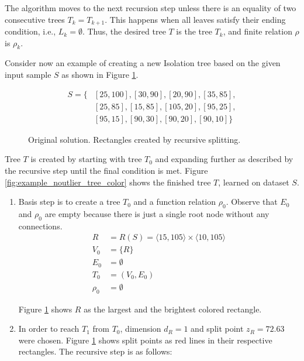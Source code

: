 The algorithm moves to the next recursion step unless there is an equality of two consecutive trees \(T_k = T_{k+1}\). This happens when all leaves satisfy their ending condition, i.e., \(L_k = \emptyset\).
Thus, the desired tree $T$ is the tree $T_k$, and finite relation $\rho$ is $\rho_k$.


\begin{example}
\label{example:original_tree_create}
Consider now an example of creating a new Isolation tree based on the given input sample $S$ as shown in Figure \ref{fig:example_noutlier_gnu}.

\begin{align*}
    S = \{&[25,100],[30,90],[20,90],[35,85],\\
    &[25,85],[15,85],[105,20],[95,25], \\
    &[95,15],[90,30],[90,20],[90,10]\}
\end{align*}


\begin{figure}[htbp]
\centering

\caption{Original solution. Rectangles created by recursive splitting.}
\label{fig:example_noutlier_gnu}
\end{figure}

Tree $T$ is created by starting with tree $T_0$ and expanding further as described by the recursive step until the final condition is met.
Figure \ref{fig:example_noutlier_tree_color} shows the finished tree $T$, learned on dataset $S$.

\begin{enumerate}
    \item Basis step is to create a tree $T_0$ and a function relation $\rho_0$. 
    Observe that $E_0$ and $\rho_0$ are empty because there is just a single root node without any connections.
\begin{align*}
R &= R(S) = \langle 15, 105 \rangle \times \langle 10, 105 \rangle\\
V_0 &= \{R\}\\
E_0 &= \emptyset\\
T_0 &= (V_0, E_0)\\
\rho_0 &= \emptyset
\end{align*}

Figure \ref{fig:example_noutlier_gnu} shows $R$ as the largest and the brightest colored rectangle.

\item In order to reach $T_1$ from $T_0$, dimension $d_R=1$ and split point $z_R = 72.63$ were chosen. Figure \ref{fig:example_noutlier_gnu} shows split points as red lines in their respective rectangles. The recursive step is as follows:


\end{enumerate}
\end{example}
